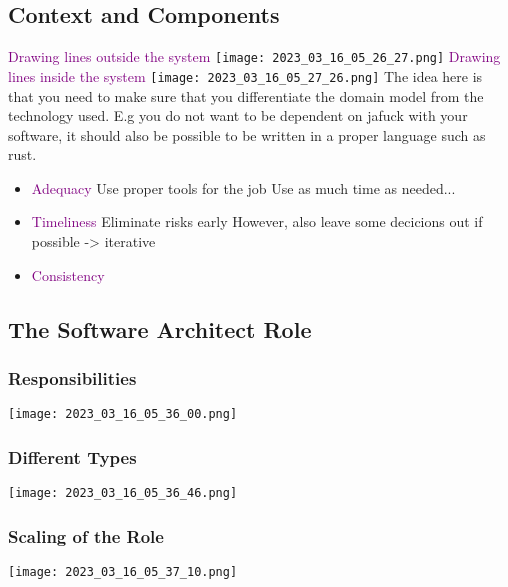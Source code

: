 \documentclass[main.tex,fontsize=8pt,paper=a4,paper=portrait,DIV=calc,]{scrartcl}
\begin{document}
\subsection{Context and Components}
\textcolor{purple}{Drawing lines outside the system}\newline
\texttt{[image: 2023\_03\_16\_05\_26\_27.png]}\newline
\textcolor{purple}{Drawing lines inside the system}\newline
\texttt{[image: 2023\_03\_16\_05\_27\_26.png]}\newline
The idea here is that you need to make sure that you differentiate the domain model from the technology used.\newline
E.g you do not want to be dependent on jafuck with your software, it should also be possible to be written in a proper language such as rust.

\begin{itemize}
\item \textcolor{purple}{Adequacy}
  Use proper tools for the job\newline
  Use as much time as needed... \newline
\item \textcolor{purple}{Timeliness}\newline
  Eliminate risks early\newline
  However, also leave some decicions out if possible -> iterative 
\item \textcolor{purple}{Consistency}\newline
\end{itemize} 

\subsection{The Software Architect Role}

\subsubsection{Responsibilities}
\texttt{[image: 2023\_03\_16\_05\_36\_00.png]}

\subsubsection{Different Types}
\texttt{[image: 2023\_03\_16\_05\_36\_46.png]}

\subsubsection{Scaling of the Role}
\texttt{[image: 2023\_03\_16\_05\_37\_10.png]}
\end{document}
